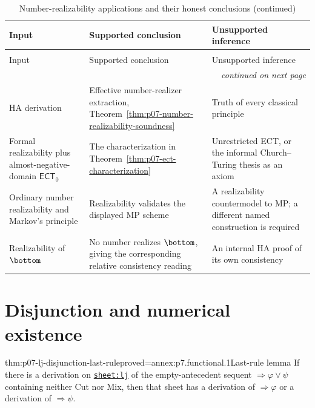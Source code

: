 \begingroup\small
\begin{longtable}{@{}p{}p{}p{}@{}}
\caption{Number-realizability applications and their honest conclusions.}
\label{tab:p07-realizability-applications}\\
\toprule
Input & Supported conclusion & Unsupported inference \\
\midrule
\endfirsthead
\caption[]{Number-realizability applications and their honest conclusions (continued)}\\
\toprule
Input & Supported conclusion & Unsupported inference \\
\midrule
\endhead
\midrule\multicolumn{3}{r}{\emph{continued on next page}}\\
\endfoot
\endlastfoot
HA derivation & Effective number-realizer extraction,
Theorem~\ref{thm:p07-number-realizability-soundness} & Truth of every
classical principle \\
Formal realizability plus almost-negative-domain \(\mathsf{ECT}_0\) & The
characterization in Theorem~\ref{thm:p07-ect-characterization} & Unrestricted
ECT, or the informal Church--Turing thesis as an axiom \\
Ordinary number realizability and Markov's principle & Realizability validates
the displayed MP scheme & A realizability countermodel to MP; a different
named construction is required \\
Realizability of \(\bottom\) & No number realizes \(\bottom\), giving the
corresponding relative consistency reading & An internal HA proof of its own
consistency \\
\bottomrule
\end{longtable}
\endgroup

\section{Disjunction and numerical existence}
\label{sec:p07-constructive-properties}



\begin{hblemma}{thm:p07-lj-disjunction-last-rule}{proved=annex:p7.functional.1}{Last-rule lemma}
If there is a derivation on
\hyperref[sheet:lj]{\texttt{sheet:lj}} of the empty-antecedent sequent
\(\Rightarrow\varphi\lor\psi\) containing neither Cut nor Mix, then that sheet
has a derivation of \(\Rightarrow\varphi\) or a derivation of
\(\Rightarrow\psi\).
\end{hblemma}

